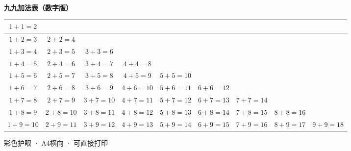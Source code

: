 \documentclass[a4paper,12pt,UTF8]{ctexart}
\begin{document}
\centering
\vspace*{5mm}

{\Huge\bfseries 九九加法表（数字版）}\\[1em]

\renewcommand{\arraystretch}{1.8}
\large

\begin{tabular}{|c|c|c|c|c|c|c|c|c|}
\hline
\rowcolor{row1} $1+1=2$ & & & & & & & & \\
\hline
\rowcolor{row2} $1+2=3$ & $2+2=4$ & & & & & & & \\
\hline
\rowcolor{row3} $1+3=4$ & $2+3=5$ & $3+3=6$ & & & & & & \\
\hline
\rowcolor{row1} $1+4=5$ & $2+4=6$ & $3+4=7$ & $4+4=8$ & & & & & \\
\hline
\rowcolor{row2} $1+5=6$ & $2+5=7$ & $3+5=8$ & $4+5=9$ & $5+5=10$ & & & & \\
\hline
\rowcolor{row3} $1+6=7$ & $2+6=8$ & $3+6=9$ & $4+6=10$ & $5+6=11$ & $6+6=12$ & & & \\
\hline
\rowcolor{row1} $1+7=8$ & $2+7=9$ & $3+7=10$ & $4+7=11$ & $5+7=12$ & $6+7=13$ & $7+7=14$ & & \\
\hline
\rowcolor{row2} $1+8=9$ & $2+8=10$ & $3+8=11$ & $4+8=12$ & $5+8=13$ & $6+8=14$ & $7+8=15$ & $8+8=16$ & \\
\hline
\rowcolor{row3} $1+9=10$ & $2+9=11$ & $3+9=12$ & $4+9=13$ & $5+9=14$ & $6+9=15$ & $7+9=16$ & $8+9=17$ & $9+9=18$ \\
\hline
\end{tabular}

\vspace{1cm}
\small 彩色护眼 · A4横向 · 可直接打印
\end{document}
